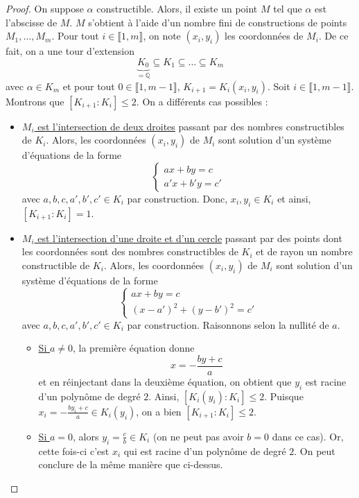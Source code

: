 
  \begin{proof}
    On suppose $\alpha$ constructible. Alors, il existe un point $M$ tel que $\alpha$ est l'abscisse de $M$. $M$ s'obtient à l'aide d'un nombre fini de constructions de points $M_1, \dots, M_m$. Pour tout $i \in \llbracket 1, m \rrbracket$, on note $(x_i, y_i)$ les coordonnées de $M_i$. De ce fait, on a une tour d'extension
    \[ \underbrace{K_0}_{= \mathbb{Q}} \subseteq K_1 \subseteq \dots \subseteq K_m \]
    avec $\alpha \in K_m$ et pour tout $0 \in \llbracket 1, m-1 \rrbracket$, $K_{i+1} = K_i(x_i, y_i)$. Soit $i \in \llbracket 1, m-1 \rrbracket$. Montrons que $[K_{i+1}:K_i] \leq 2$. On a différents cas possibles :
    \begin{itemize}
      \item \uline{$M_i$ est l'intersection de deux droites} passant par des nombres constructibles de $K_i$. Alors, les coordonnées $(x_i, y_i)$ de $M_i$ sont solution d'un système d'équations de la forme
      \[
        \begin{cases}
          ax + by = c \\
          a'x + b'y = c'
        \end{cases}
      \]
      avec $a, b, c, a', b', c' \in K_i$ par construction. Donc, $x_i, y_i \in K_i$ et ainsi, $[K_{i+1}:K_i] = 1$.
      \item \uline{$M_i$ est l'intersection d'une droite et d'un cercle} passant par des points dont les coordonnées sont des nombres constructibles de $K_i$ et de rayon un nombre constructible de $K_i$. Alors, les coordonnées $(x_i, y_i)$ de $M_i$ sont solution d'un système d'équations de la forme
      \[
        \begin{cases}
          ax + by = c \\
          (x-a')^2 + (y-b')^2 = c'
        \end{cases}
      \]
      avec $a, b, c, a', b', c' \in K_i$ par construction. Raisonnons selon la nullité de $a$.
      \begin{itemize}
        \item \uline{Si $a \neq 0$}, la première équation donne
        \[ x = -\frac{by+c}{a} \]
        et en réinjectant dans la deuxième équation, on obtient que $y_i$ est racine d'un polynôme de degré $2$. Ainsi, $[K_i(y_i) : K_i] \leq 2$. Puisque $x_i = -\frac{by_i+c}{a} \in K_i(y_i)$, on a bien $[K_{i+1}:K_i] \leq 2$.
        \item \uline{Si $a = 0$}, alors $y_i = \frac{c}{b} \in K_i$ (on ne peut pas avoir $b = 0$ dans ce cas). Or, cette fois-ci c'est $x_i$ qui est racine d'un polynôme de degré $2$. On peut conclure de la même manière que ci-dessus.

\end{itemize}
\end{itemize}
\end{proof}
